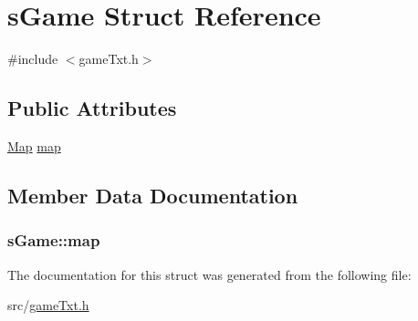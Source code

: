 \hypertarget{structs_game}{}\section{s\+Game Struct Reference}
\label{structs_game}


{\ttfamily \#include $<$game\+Txt.\+h$>$}

\subsection*{Public Attributes}
\begin{DoxyCompactItemize}
\item 
\hyperlink{map_8h_af9824e0a3cac785d07b43c5265fddd5a}{Map} \hyperlink{structs_game_a530f96ca01d933573496424da40b99bb}{map}
\end{DoxyCompactItemize}


\subsection{Member Data Documentation}
\hypertarget{structs_game_a530f96ca01d933573496424da40b99bb}{}
\subsubsection[{map}]{ s\+Game\+::map}\label{structs_game_a530f96ca01d933573496424da40b99bb}


The documentation for this struct was generated from the following file\+:\begin{DoxyCompactItemize}
\item 
src/\hyperlink{game_txt_8h}{game\+Txt.\+h}\end{DoxyCompactItemize}
